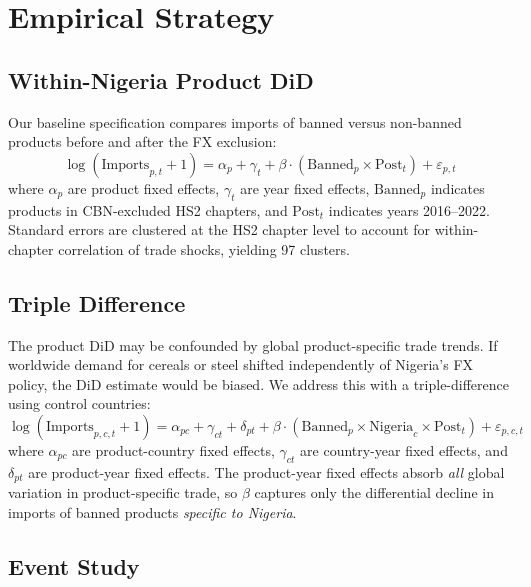 \documentclass[12pt]{article}
\begin{document}
\section{Empirical Strategy}

\subsection{Within-Nigeria Product DiD}

Our baseline specification compares imports of banned versus non-banned products before and after the FX exclusion:
\begin{equation}
\log(\text{Imports}_{p,t} + 1) = \alpha_p + \gamma_t + \beta \cdot (\text{Banned}_p \times \text{Post}_t) + \varepsilon_{p,t}
\label{eq:did}
\end{equation}
where $\alpha_p$ are product fixed effects, $\gamma_t$ are year fixed effects, $\text{Banned}_p$ indicates products in CBN-excluded HS2 chapters, and $\text{Post}_t$ indicates years 2016--2022. Standard errors are clustered at the HS2 chapter level to account for within-chapter correlation of trade shocks, yielding 97 clusters.

\subsection{Triple Difference}

The product DiD may be confounded by global product-specific trade trends. If worldwide demand for cereals or steel shifted independently of Nigeria's FX policy, the DiD estimate would be biased. We address this with a triple-difference using control countries:
\begin{equation}
\log(\text{Imports}_{p,c,t} + 1) = \alpha_{pc} + \gamma_{ct} + \delta_{pt} + \beta \cdot (\text{Banned}_p \times \text{Nigeria}_c \times \text{Post}_t) + \varepsilon_{p,c,t}
\label{eq:ddd}
\end{equation}
where $\alpha_{pc}$ are product-country fixed effects, $\gamma_{ct}$ are country-year fixed effects, and $\delta_{pt}$ are product-year fixed effects. The product-year fixed effects absorb \textit{all} global variation in product-specific trade, so $\beta$ captures only the differential decline in imports of banned products \textit{specific to Nigeria}.

\subsection{Event Study}
\end{document}
